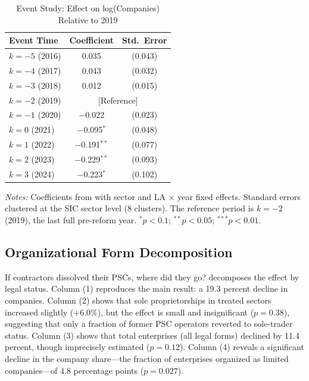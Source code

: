 \documentclass[12pt]{article}
\begin{document}
\begin{table}[htbp]
\centering
\caption{Event Study: Effect on log(Companies) Relative to 2019}
\label{tab:eventstudy}
\begin{threeparttable}
\begin{tabular}{lcc}
\toprule
Event Time & Coefficient & Std.\ Error \\
\midrule
$k = -5$ (2016) & 0.035 & (0.043) \\
$k = -4$ (2017) & 0.043 & (0.032) \\
$k = -3$ (2018) & 0.012 & (0.015) \\
$k = -2$ (2019) & \multicolumn{2}{c}{[Reference]} \\
$k = -1$ (2020) & $-$0.022 & (0.023) \\
$k = 0$ (2021) & $-$0.095$^{*}$ & (0.048) \\
$k = 1$ (2022) & $-$0.191$^{**}$ & (0.077) \\
$k = 2$ (2023) & $-$0.229$^{**}$ & (0.093) \\
$k = 3$ (2024) & $-$0.223$^{*}$ & (0.102) \\
\bottomrule
\end{tabular}
\begin{tablenotes}[flushleft]
\small
\item \textit{Notes:} Coefficients from  with sector and LA $\times$ year fixed effects. Standard errors clustered at the SIC sector level (8 clusters). The reference period is $k = -2$ (2019), the last full pre-reform year. $^{*}p<0.1$; $^{**}p<0.05$; $^{***}p<0.01$.
\end{tablenotes}
\end{threeparttable}
\end{table}

\subsection{Organizational Form Decomposition}

If contractors dissolved their PSCs, where did they go?  decomposes the effect by legal status. Column (1) reproduces the main result: a 19.3 percent decline in companies. Column (2) shows that sole proprietorships in treated sectors increased slightly ($+$6.0\%), but the effect is small and insignificant ($p = 0.38$), suggesting that only a fraction of former PSC operators reverted to sole-trader status. Column (3) shows that total enterprises (all legal forms) declined by 11.4 percent, though imprecisely estimated ($p = 0.12$). Column (4) reveals a significant decline in the company share---the fraction of enterprises organized as limited companies---of 4.8 percentage points ($p = 0.027$).
\end{document}
